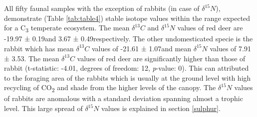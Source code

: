 \documentclass[5p]{elsarticle} %
\begin{document}
All fifty faunal samples with the exception of rabbits (in case of \(\delta ^{15}N\)), demonstrate (Table \ref{tab:table4}) stable isotope values within the range expected for a C\textsubscript{3} temperate ecosystem. The mean \(\delta ^{13}C\) and \(\delta ^{15}N\) values of red deer are -19.97 ± 0.19\permil and 3.67 ± 0.49\permil respectively. The other undomesticated specie is the rabbit which has mean \(\delta ^{13}C\) values of -21.61 ± 1.07\permil and mean \(\delta ^{15}N\) values of 7.91 ± 3.53\permil. The mean \(\delta ^{13}C\) values of red deer are significantly higher than those of rabbit (t-statistic: -4.01, degrees of freedom: 12, \emph{p}-value: 0). This can attributed to the foraging area of the rabbits which is usually at the ground level with high recycling of CO\textsubscript{2} and shade from the higher levels of the canopy. The \(\delta ^{15}N\) values of rabbits are anomalous with a standard deviation spanning almost a trophic level. This large spread of \(\delta ^{15}N\) values is explained in section \ref{sulphur}.
\end{document}
